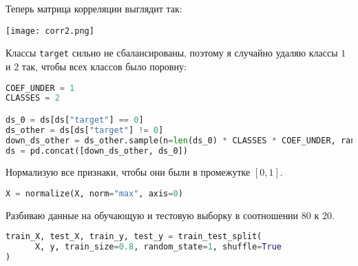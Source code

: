Теперь матрица корреляции выглядит так:
\begin{center}
      \texttt{[image: corr2.png]}\newline\noindent
\end{center}
Классы \texttt{target} сильно не сбалансированы, поэтому я случайно удаляю классы $1$ и $2$ так, чтобы всех классов было поровну:
\begin{lstlisting}[language=python, keepspaces=true]
COEF_UNDER = 1
CLASSES = 2

ds_0 = ds[ds["target"] == 0]
ds_other = ds[ds["target"] != 0]
down_ds_other = ds_other.sample(n=len(ds_0) * CLASSES * COEF_UNDER, random_state=1)
ds = pd.concat([down_ds_other, ds_0])
\end{lstlisting}
Нормализую все признаки, чтобы они были в промежутке $[0, 1]$.
\begin{lstlisting}[language=python, keepspaces=true]
X = normalize(X, norm="max", axis=0)
\end{lstlisting}
Разбиваю данные на обучающую и тестовую выборку в соотношении 80 к 20.
\begin{lstlisting}[language=python, keepspaces=true]
train_X, test_X, train_y, test_y = train_test_split(
      X, y, train_size=0.8, random_state=1, shuffle=True
)
\end{lstlisting}
\pagebreak